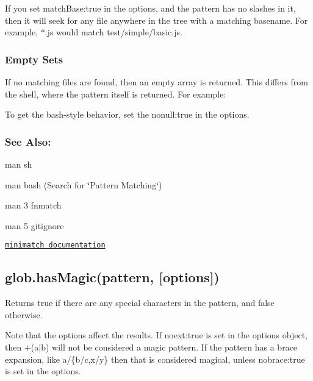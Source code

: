 If you set {\ttfamily match\+Base\+:true} in the options, and the pattern has no slashes in it, then it will seek for any file anywhere in the tree with a matching basename. For example, {\ttfamily $\ast$.js} would match {\ttfamily test/simple/basic.\+js}.

\subsubsection*{Empty Sets}

If no matching files are found, then an empty array is returned. This differs from the shell, where the pattern itself is returned. For example\+: 


To get the bash-\/style behavior, set the {\ttfamily nonull\+:true} in the options.

\subsubsection*{See Also\+:}


\begin{DoxyItemize}
\item {\ttfamily man sh}
\item {\ttfamily man bash} (Search for \char`\"{}\+Pattern Matching\char`\"{})
\item {\ttfamily man 3 fnmatch}
\item {\ttfamily man 5 gitignore}
\item \href{https://github.com/isaacs/minimatch}{\tt minimatch documentation}
\end{DoxyItemize}

\subsection*{glob.\+has\+Magic(pattern, \mbox{[}options\mbox{]})}

Returns {\ttfamily true} if there are any special characters in the pattern, and {\ttfamily false} otherwise.

Note that the options affect the results. If {\ttfamily noext\+:true} is set in the options object, then {\ttfamily +(a$\vert$b)} will not be considered a magic pattern. If the pattern has a brace expansion, like {\ttfamily a/\{b/c,x/y\}} then that is considered magical, unless {\ttfamily nobrace\+:true} is set in the options.

